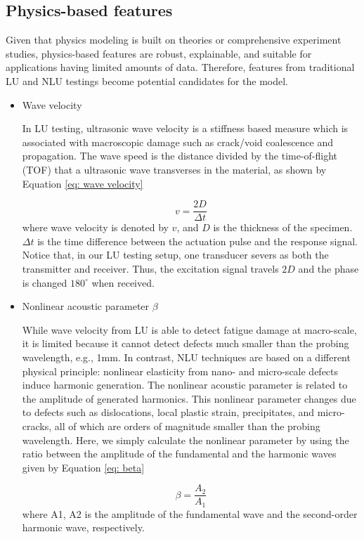 \subsection{Physics-based features}
Given that physics modeling is built on theories or comprehensive experiment studies, physics-based features are robust, explainable, and suitable for applications having limited amounts of data. Therefore, features from traditional LU and NLU testings become potential candidates for the model.
\begin{itemize}
    \item Wave velocity
    
    In LU testing, ultrasonic wave velocity is a stiffness based measure which is associated with macroscopic damage such as crack/void coalescence and propagation. The wave speed is the distance divided by the time-of-flight (TOF) that a ultrasonic wave transverses in the material, as shown by Equation \eqref{eq: wave velocity}
    
    \begin{equation}
        v = \frac{2D}{\Delta t}
        \label{eq: wave velocity}
    \end{equation}
    where wave velocity is denoted by $v$, and $D$ is the thickness of the specimen. $\Delta t$ is the time difference between the actuation pulse and the response signal. Notice that, in our LU testing setup, one transducer severs as both the transmitter and receiver. Thus, the excitation signal travels $2D$ and the phase is changed $180^{\circ} $ when received.

    \item Nonlinear acoustic parameter $\beta$
    
    While wave velocity from LU is able to detect fatigue damage at macro-scale, it is limited because it cannot detect defects much smaller than the probing wavelength, e.g., 1mm. In contrast, NLU techniques are based on a different physical principle: nonlinear elasticity from nano- and micro-scale defects induce harmonic generation. The nonlinear acoustic parameter is related to the amplitude of generated harmonics. This nonlinear parameter changes due to defects such as dislocations, local plastic strain, precipitates, and micro-cracks, all of which are orders of magnitude smaller than the probing wavelength. Here, we simply calculate the nonlinear parameter by using the ratio between the amplitude of the fundamental and the harmonic waves given by Equation \eqref{eq: beta}

    \begin{equation}
        \beta = \frac{A_2}{A_1}
        \label{eq: beta}
    \end{equation}
    where A1, A2 is the amplitude of the fundamental wave and the second-order harmonic wave, respectively.
\end{itemize}

